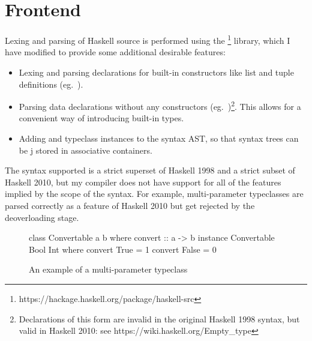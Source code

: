 \documentclass[dissertation.tex]{subfiles}
\begin{document}
\section{Frontend}
{

    Lexing and parsing of Haskell source is performed using the
    \footnote{https://hackage.haskell.org/package/haskell-src} library, which I have modified to
    provide some additional desirable features:

    \begin{itemize}
    \item
    {
        Lexing and parsing declarations for built-in constructors like list and tuple definitions (eg.\ ).
    }
    \item
    {

        Parsing data declarations without any constructors (eg.\ )\footnote{Declarations of this form
        are invalid in the original Haskell 1998 syntax, but valid in Haskell 2010: see
        https://wiki.haskell.org/Empty\_type}. This allows for a convenient way of introducing built-in types.

    }
    \item
    {

        Adding  and  typeclass instances to the syntax AST, so that syntax trees can be
j       stored in associative containers.

    }
    \end{itemize}

    The syntax supported is a strict superset of Haskell 1998 and a strict subset of Haskell 2010, but my compiler does
    not have support for all of the features implied by the scope of the syntax. For example, multi-parameter
    typeclasses are parsed correctly as a feature of Haskell 2010 but get rejected by the deoverloading stage.

    \begin{figure}[h]
        \begin{haskellfigure}
        class Convertable a b where
            convert :: a -> b
        instance Convertable Bool Int where
            convert True = 1
            convert False = 0
        \end{haskellfigure}
        \caption{An example of a multi-parameter typeclass}
    \end{figure}

}
\end{document}
